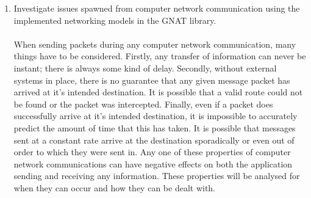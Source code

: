 \begin{enumerate}
\item Investigate issues spawned from computer network communication using the implemented networking models in the GNAT library.
  \\\\
  When sending packets during any computer network communication, many things have to be considered. Firstly, any transfer of information can never be instant; there is always some kind of delay. Secondly, without external systems in place, there is no guarantee that any given message packet has arrived at it's intended destination. It is possible that a valid route could not be found or the packet was intercepted. Finally, even if a packet does successfully arrive at it's intended destination, it is impossible to accurately predict the amount of time that this has taken. It is possible that messages sent at a constant rate arrive at the destination sporadically or even out of order to which they were sent in.
  Any one of these properties of computer network communications can have negative effects on both the application sending and receiving any information. These properties will be analysed for when they can occur and how they can be dealt with.
\end{enumerate}


\newpage
